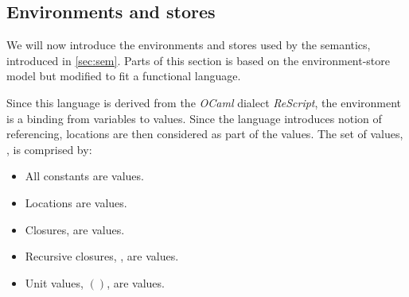 \documentclass[../../master.tex]{subfiles}
\begin{document}
\iffalse
\begin{definition}[Bound variables]\label{def:bv}
	The set of bound variables is given by:
	\begin{align*}
		bv(x^p)&=\emptyset\\
		bv(c^p)&=\emptyset\\
		bv([\lambda\;y.e_1^{p'}]^p)&=bv(e_1^{p'})\cup\{y\}\\
		bv([e_1^{p'}\;e_2^{p''}]^p)&=bv(e_1^{p'})\cup bv(e_2^{p''})\\
		bv([\mbox{let}\;y\;e_1^{p'}\;e_2^{p''}]^p)&=bv(e_1^{p'})\cup bv(e_2^{p''})\cup\{y\}\\
		bv([\mbox{let rec}\;f\;e_1^{p'}\;e_2^{p''}]^p)&=bv(e_1^{p'})\cup bv(e_2^{p''})\cup\{f\}\\
		bv([\mbox{case}\;e^{p'}\;\pi^{p''}]^p)&=bv(e_1^{p'})\cup bv(\pi)\\
		bv([(s\;e^{p'})\;\pi])&=bv(e^{p'})\cup bv(\pi)\cup\tau(s)\\
		bv([(s\;e^{p'})])&=bv(e^{p'})\cup\tau(s)\\
		bv([\mbox{ref}\;e^{p'}]^p)&=bv(e^{p'})\\
		bv([!e^{p'}]^p)&=bv(e^{p'})\\
		bv([e_1^{p'}\;:=\;e_2^{p''}]^p)&=bv(e_1^{p'})\cup bv(e_2^{p''})\\
	\end{align*}
\end{definition}
\fi

\subsection{Environments and stores}\label{sec:EnvSto}
We will now introduce the environments and stores used by the semantics, introduced in \cref{sec:sem}.
Parts of this section is based on the environment-store model but modified to fit a functional language.

Since this language is derived from the \emph{OCaml} dialect \emph{ReScript}, the environment is a binding from variables to values.
Since the language introduces notion of referencing, locations are then considered as part of the values.
The set of values, , is comprised by:
\begin{itemize}
	\item All constants are values.
	\item Locations are values.
	\item Closures,  are values.
	\item Recursive closures, , are values.
	\item Unit values, $()$, are values.
\end{itemize}
\end{document}
